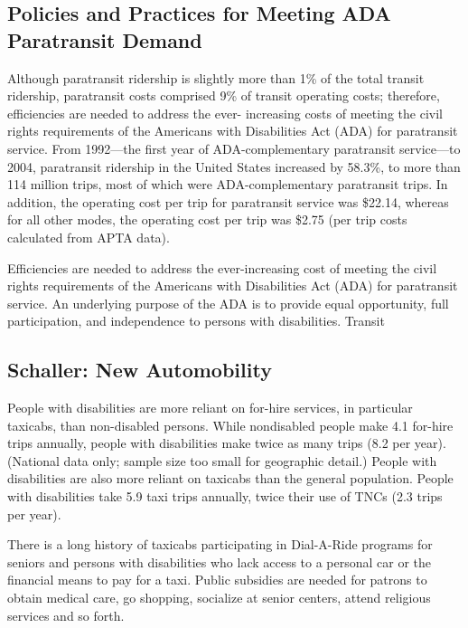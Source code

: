 \documentclass[]{article}
\begin{document}
\hypertarget{policies-and-practices-for-meeting-ada-paratransit-demand}{%
\subsection{Policies and Practices for Meeting ADA Paratransit
Demand}\label{policies-and-practices-for-meeting-ada-paratransit-demand}}

Although paratransit ridership is slightly more than 1\% of the total
transit ridership, paratransit costs comprised 9\% of transit operating
costs; therefore, efficiencies are needed to address the ever-
increasing costs of meeting the civil rights requirements of the
Americans with Disabilities Act (ADA) for paratransit service. From
1992---the first year of ADA-complementary paratransit service---to
2004, paratransit ridership in the United States increased by 58.3\%, to
more than 114 million trips, most of which were ADA-complementary
paratransit trips. In addition, the operating cost per trip for
paratransit service was \$22.14, whereas for all other modes, the
operating cost per trip was \$2.75 (per trip costs calculated from APTA
data).

Efficiencies are needed to address the ever-increasing cost of meeting
the civil rights requirements of the Americans with Disabilities Act
(ADA) for paratransit service. An underlying purpose of the ADA is to
provide equal opportunity, full participation, and independence to
persons with disabilities. Transit

\hypertarget{schaller-new-automobility}{%
\subsection{Schaller: New
Automobility}\label{schaller-new-automobility}}

People with disabilities are more reliant on for-hire services, in
particular taxicabs, than non-disabled persons. While nondisabled people
make 4.1 for-hire trips annually, people with disabilities make twice as
many trips (8.2 per year). (National data only; sample size too small
for geographic detail.) People with disabilities are also more reliant
on taxicabs than the general population. People with disabilities take
5.9 taxi trips annually, twice their use of TNCs (2.3 trips per year).

There is a long history of taxicabs participating in Dial-A-Ride
programs for seniors and persons with disabilities who lack access to a
personal car or the financial means to pay for a taxi. Public subsidies
are needed for patrons to obtain medical care, go shopping, socialize at
senior centers, attend religious services and so forth.
\end{document}
